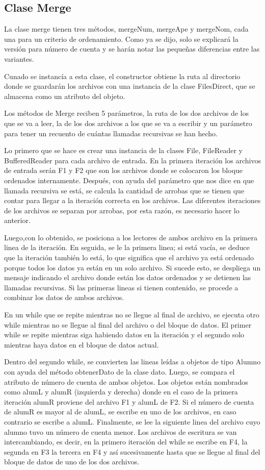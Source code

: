 \documentclass[11pt]{article}
\begin{document}
\subsection{Clase Merge}
La clase merge tienen tres métodos, mergeNum, mergeApe y mergeNom, cada una para un criterio de ordenamiento. Como ya se dijo, solo se explicará la versión para número de cuenta y se harán notar las pequeñas diferencias entre las variantes.
\par
Cunado se instancía a esta clase, el constructor obtiene la ruta al directorio donde se guardarán los archivos con una instancia de la clase FilesDirect, que se almacena como un atributo del objeto.
\par
Los métodos de Merge reciben 5 parámetros, la ruta de los dos archivos de los que se va a leer, la de los dos archivos a los que se va a escribir y un parámetro para tener un recuento de cuántas llamadas recursivas se han hecho. 
\par
Lo primero que se hace es crear una instancia de la clases File, FileReader y BufferedReader para cada archivo de entrada. En la primera iteración los archivos de entrada serán F1 y F2 que son los archivos donde se colocaron los bloque ordenados internamente. Después, con ayuda del parámetro que nos dice en 
que llamada recursiva se está, se calcula la cantidad de arrobas que se tienen que contar para llegar a la iteración correcta en los archivos. Las diferentes iteraciones de los archivos se separan por arrobas, por esta razón, es necesario hacer lo anterior.
\par
Luego,con lo obtenido, se posiciona a los lectores de ambos archivo en la primera linea de la iteración. En seguida, se le la primera linea; si está vacía, se deduce que la iteración también lo está, lo que significa que el archivo ya está ordenado porque todos los datos ya están en un solo archivo. Si sucede esto, se despliega un mensaje indicando el archivo donde están los datos ordenados y se detienen las llamadas recursivas. Si las primeras lineas si tienen contenido, se procede a combinar los datos de ambos archivos.
\par
En un while que se repite mientras no se llegue al final de archivo, se ejecuta otro while mientras no se llegue al final del archivo o del bloque de datos. El primer while se repite mientras siga habiendo datos en la iteración y el segundo solo mientras haya datos en el bloque de datos actual.
\par
Dentro del segundo while, se convierten las lineas leídas a objetos de tipo Alumno con ayuda del método obtenerDato de la clase dato. Luego, se compara el atributo de número de cuenta de ambos objetos. Los objetos están nombrados como alumL y alumR (izquierda y derecha) donde en el caso de la primera iteración alumR proviene del archivo F1 y alumL de F2. Si el número de cuenta de alumR es mayor al de alumL, se escribe en uno de los archivos, en caso contrario se escribe a alumL. Finalmente, se lee la siguiente linea del archivo cuyo alumno tuvo un número de cuenta menor. Los archivos de escritura se van intercambiando, es decir, en la primero iteración del while se escribe en F4, la segunda en F3 la tercera en F4 y así sucesivamente hasta que se llegue al final del bloque de datos de uno de los dos archivos.
\end{document}
